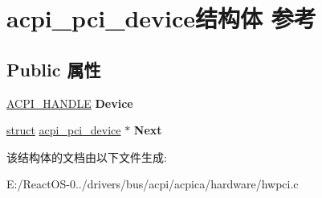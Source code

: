\hypertarget{structacpi__pci__device}{}\section{acpi\+\_\+pci\+\_\+device结构体 参考}
\label{structacpi__pci__device}
\subsection*{Public 属性}
\begin{DoxyCompactItemize}
\item 
\mbox{\label{structacpi__pci__device_a2be05582fdab1358b74dacaeb91358fc}} 
\hyperlink{interfacevoid}{A\+C\+P\+I\+\_\+\+H\+A\+N\+D\+LE} {\bfseries Device}
\item 
\mbox{\label{structacpi__pci__device_a208c61d163b6b49291296eca89b0ece2}} 
\hyperlink{interfacestruct}{struct} \hyperlink{structacpi__pci__device}{acpi\+\_\+pci\+\_\+device} $\ast$ {\bfseries Next}
\end{DoxyCompactItemize}


该结构体的文档由以下文件生成\+:\begin{DoxyCompactItemize}
\item 
E\+:/\+React\+O\+S-\/0../drivers/bus/acpi/acpica/hardware/hwpci.\+c\end{DoxyCompactItemize}
